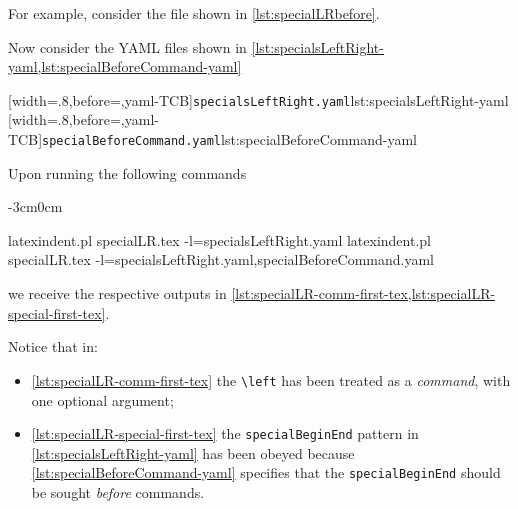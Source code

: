 \documentclass[10pt]{article}
\newenvironment{widepage}{\begin{adjustwidth}{-3cm}{0cm}}{\end{adjustwidth}}
\begin{document}
 \begin{example}
 For example, consider the file shown in \cref{lst:specialLRbefore}.%


 Now consider the YAML files shown in
 \cref{lst:specialsLeftRight-yaml,lst:specialBeforeCommand-yaml}

 \begin{cmhtcbraster}
  [width=.8\linewidth,before=\centering,yaml-TCB]{\texttt{specialsLeftRight.yaml}}{lst:specialsLeftRight-yaml}
  [width=.8\linewidth,before=\centering,yaml-TCB]{\texttt{specialBeforeCommand.yaml}}{lst:specialBeforeCommand-yaml}
 \end{cmhtcbraster}

 Upon running the following commands 
 \begin{widepage}

  \begin{commandshell}
latexindent.pl specialLR.tex -l=specialsLeftRight.yaml      
latexindent.pl specialLR.tex -l=specialsLeftRight.yaml,specialBeforeCommand.yaml      
\end{commandshell}

 \end{widepage}
 we receive the respective outputs in
 \cref{lst:specialLR-comm-first-tex,lst:specialLR-special-first-tex}.

 \begin{minipage}{.49\linewidth}
 \end{minipage}
 \hfill
 \begin{minipage}{.49\linewidth}
 \end{minipage}

 Notice that in:
 \begin{itemize}
  \item \cref{lst:specialLR-comm-first-tex} the \lstinline!\left! has been treated as a
        \emph{command}, with one optional argument;
  \item \cref{lst:specialLR-special-first-tex} the \texttt{specialBeginEnd} pattern in
        \cref{lst:specialsLeftRight-yaml}
        has been obeyed because \cref{lst:specialBeforeCommand-yaml} specifies that the
        \texttt{specialBeginEnd} should be sought \emph{before} commands.
 \end{itemize}
 \end{example}
\end{document}
